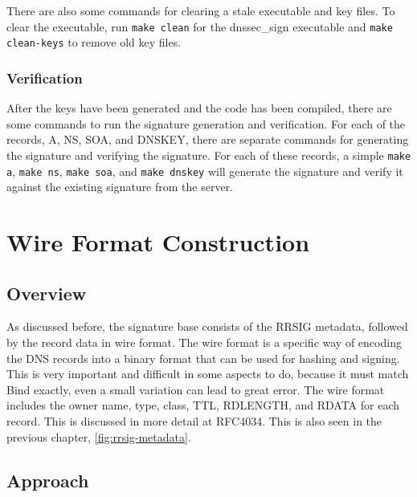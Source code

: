 There are also some commands for clearing a stale executable and key files. To clear the executable, run \texttt{make clean} 
for the dnssec\_sign executable and \texttt{make clean-keys} to remove old key files.

\subsubsection{Verification}

After the keys have been generated and the code has been compiled, there are some commands to run the signature generation 
and verification. For each of the records, A, NS, SOA, and DNSKEY, there are separate commands for generating the signature and verifying the signature. 
For each of these records, a simple \texttt{make a}, \texttt{make ns}, \texttt{make soa}, and \texttt{make dnskey} will generate the 
signature and verify it against the existing signature from the server.

\section{Wire Format Construction}

\subsection{Overview}

As discussed before, the signature base consists of the RRSIG metadata, followed by the record data in wire format. The wire format is a specific 
way of encoding the DNS records into a binary format that can be used for hashing and signing. This is very important and difficult in some aspects to do, because it 
must match Bind exactly, even a small variation can lead to great error. The wire format includes the owner name, type, class, 
TTL, RDLENGTH, and RDATA for each record. This is discussed in more detail at RFC4034.\cite{rfc4034} This is also seen in the previous chapter, \cref{fig:rrsig-metadata}.

\subsection{Approach}


